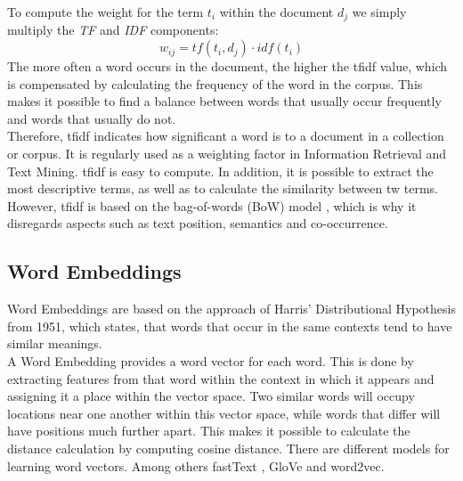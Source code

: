 \documentclass[a4paper, 11pt,titlepage,oneside,openany]{book}
\begin{document}
\indent To compute the weight for the term $t_i$ within the document $d_j$ we simply multiply the \textit{TF} and \textit{IDF} components:
\[
w_{ij}=tf(t_i, d_j)\cdot idf(t_i)
\]
\indent The more often a word occurs in the document, the higher the \gls{tfidf} value, which is compensated by calculating the frequency of the word in the corpus. This makes it possible to find a balance between words that usually occur frequently and words that usually do not.\\
\newpage
Therefore, \Gls{tfidf} indicates how significant a word is to a document in a collection or corpus. It is regularly used as a weighting factor in Information Retrieval and Text Mining. \Gls{tfidf} is easy to compute. In addition, it is possible to extract the most descriptive terms, as well as to calculate the similarity between tw terms. However, \gls{tfidf} is based on the bag-of-words (BoW) model \cite{distributionalhypothesis}, which is why it disregards aspects such as text position, semantics and co-occurrence.

\subsection{Word Embeddings}
\indent Word Embeddings are based on the approach of Harris' Distributional Hypothesis \cite{distributionalhypothesis} from 1951, which states, that words that occur in the same contexts tend to have similar meanings. \\
\indent A Word Embedding provides a word vector for each word. This is done by extracting features from that word within the context in which it appears and assigning it a place within the vector space. Two similar words will occupy locations near one another within this vector space, while words that differ will have positions much further apart. This makes it possible to calculate the distance calculation by computing cosine distance. There are different models for learning word vectors. Among others fastText \cite{fasttext}, GloVe \cite{glove} and word2vec. \\
\end{document}
